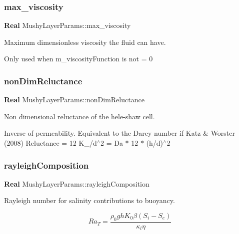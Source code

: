 \subsubsection{\texorpdfstring{max\+\_\+viscosity}{max\_viscosity}}
{\footnotesize\ttfamily \textbf{ Real} Mushy\+Layer\+Params\+::max\+\_\+viscosity}



Maximum dimensionless viscosity the fluid can have. 

Only used when m\+\_\+viscosity\+Function is not = 0 \mbox{\label{class_mushy_layer_params_a157dde93ce7d9c83740fb9fc7fc0aadd}} 
\subsubsection{\texorpdfstring{non\+Dim\+Reluctance}{nonDimReluctance}}
{\footnotesize\ttfamily \textbf{ Real} Mushy\+Layer\+Params\+::non\+Dim\+Reluctance}



Non dimensional reluctance of the hele-\/shaw cell. 

Inverse of permeability. Equivalent to the Darcy number if Katz \& Worster (2008) Reluctance = 12 K\+\_/d$^\wedge$2 = Da $\ast$ 12 $\ast$ (h/d)$^\wedge$2 \mbox{\label{class_mushy_layer_params_a7caaf9bff2bf7525386717144ecb7118}} 
\subsubsection{\texorpdfstring{rayleigh\+Composition}{rayleighComposition}}
{\footnotesize\ttfamily \textbf{ Real} Mushy\+Layer\+Params\+::rayleigh\+Composition}



Rayleigh number for salinity contributions to buoyancy. 

\[ Ra_T = \frac{\rho_0 g h K_0 \beta (S_i - S_e)}{\kappa_l \eta} \] \mbox{\label{class_mushy_layer_params_ada4f0f588513e96f72dcb1ba35a2585f}} 
